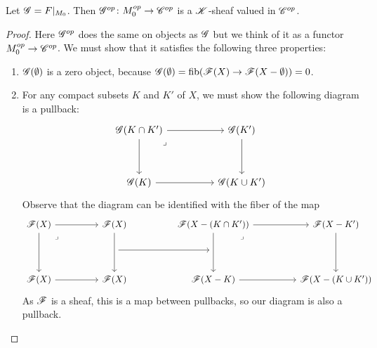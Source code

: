 \documentclass[../../thesis.tex]{subfiles}
\begin{document}
\begin{lemma}
    Let $\mathscr{G} = F|_{M_0}$.
    Then $\mathscr{G}^{op}\colon M_0^{op} \to \mathscr{C}^{op}$ is a $\mathscr{K}$-sheaf valued in $\mathscr{C}^{op}$.
\end{lemma}
\begin{proof}
    Here $\mathscr{G}^{op}$ does the same on objects as $\mathscr{G}$ but we think of it as a functor $M_0^{op}\to \mathscr{C}^{op}$.
    We must show that it satisfies the following three properties:
    \begin{enumerate}
        \item $\mathscr{G}(\emptyset)$ is a zero object, because $\mathscr{G}(\emptyset)=\operatorname{fib}(\mathscr{F}(X)\to \mathscr{F}(X-\emptyset))=0$.
        \item For any compact subsets $K$ and $K'$ of $X$, we must show the following diagram is a pullback:
              \[\begin{tikzcd}
                      {\G(K\cap K')} && {\G(K')} \\
                      \\
                      {\G(K)} && {\G(K\cup K')}
                      \arrow[from=1-1, to=3-1]
                      \arrow[from=3-1, to=3-3]
                      \arrow[from=1-1, to=1-3]
                      \arrow[from=1-3, to=3-3]
                      \arrow["\lrcorner"{anchor=center, pos=0.125}, draw=none, from=1-1, to=3-3]
                  \end{tikzcd}\]
              Observe that the diagram can be identified with the fiber of the map
              \[\begin{tikzcd}
                      {\F(X)} && {\F(X)} && {\F(X-(K\cap K'))} && {\F(X-K')} \\
                      && {} && {} \\
                      {\F(X)} && {\F(X)} && {\F(X-K)} && {\F(X-(K\cup K'))}
                      \arrow[from=1-5, to=3-5]
                      \arrow[from=3-5, to=3-7]
                      \arrow[from=1-5, to=1-7]
                      \arrow[from=1-7, to=3-7]
                      \arrow["\lrcorner"{anchor=center, pos=0.125}, draw=none, from=1-5, to=3-7]
                      \arrow[from=2-3, to=2-5]
                      \arrow[from=1-3, to=3-3]
                      \arrow[from=1-1, to=1-3]
                      \arrow[from=1-1, to=3-1]
                      \arrow[from=3-1, to=3-3]
                      \arrow["\lrcorner"{anchor=center, pos=0.125}, draw=none, from=1-1, to=3-3]
                  \end{tikzcd}\]
              As $\mathscr{F}$ is a sheaf, this is a map between pullbacks, so our diagram is also a pullback.

\end{enumerate}
\end{proof}
\end{document}

